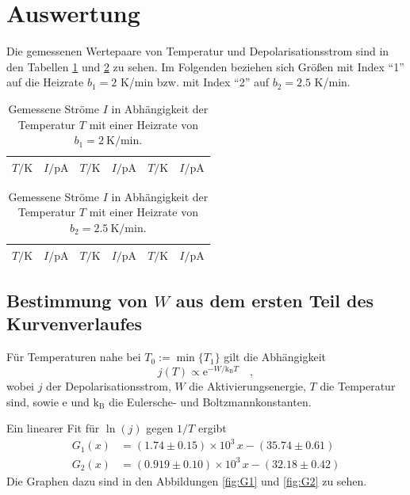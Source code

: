 \section{Auswertung}
Die gemessenen Wertepaare von Temperatur und Depolarisationsstrom sind in den
Tabellen \ref{tab:tab1} und \ref{tab:tab2} zu sehen. Im Folgenden beziehen sich Größen mit
Index "`1"' auf die Heizrate $b_1=2$ K/min bzw. mit Index "`2"' auf $b_2=2.5$
K/min.

\begin{table}[htpb]
	\centering
	\begin{tabular}{cc|cc|cc}
		\midrule
		\midrule
		$T / \si{\kelvin}$ &
		$I / \si{\pA}$ &
		$T / \si{\kelvin}$ &
		$I / \si{\pA}$ &
		$T / \si{\kelvin}$ &
		$I / \si{\pA}$ \\
		\midrule
		
		\midrule
		\midrule
	\end{tabular}
	\caption{Gemessene Ströme $I$ in Abhängigkeit der Temperatur $T$ mit
		einer Heizrate von $b_1 = \SI{2}{\kelvin\per\minute}$.}
	\label{tab:tab1}
\end{table}
%
\begin{table}[htpb]
	\centering
	\begin{tabular}{cc|cc|cc}
		\midrule
		\midrule
		$T / \si{\kelvin}$ &
		$I / \si{\pA}$ &
		$T / \si{\kelvin}$ &
		$I / \si{\pA}$ &
		$T / \si{\kelvin}$ &
		$I / \si{\pA}$ \\
		\midrule
		
		\midrule
		\midrule
	\end{tabular}
	\caption{Gemessene Ströme $I$ in Abhängigkeit der Temperatur $T$ mit
		einer Heizrate von $b_2 = \SI{2.5}{\kelvin\per\minute}$.}
	\label{tab:tab2}
\end{table}
%
\subsection{Bestimmung von $W$ aus dem ersten Teil des Kurvenverlaufes}
Für Temperaturen nahe bei $T_0:=\min\{T_1\}$ gilt die Abhängigkeit
\begin{equation}
j(T)\propto \text{e}^{-W/\text{k}_\text{B}T} \quad ,
\end{equation}
wobei $j$ der Depolarisationsstrom, $W$ die Aktivierungsenergie, $T$ die
Temperatur sind, sowie $\text{e}$ und $\text{k}_\text{B}$ die Eulersche- und
Boltzmannkonstanten.

Ein linearer Fit für $\ln(j)$ gegen $1/T$ ergibt
%
%
\begin{align}
G_1(x)&= ( 1.74\pm 0.15)\times 10^{3} \,x - (35.74 \pm 0.61) \\
G_2(x)&= (0.919 \pm 0.10 )\times 10^{3} \,x - (32.18 \pm 0.42)
\end{align}
Die Graphen dazu sind in den Abbildungen \ref{fig:G1} und \ref{fig:G2} zu sehen.


